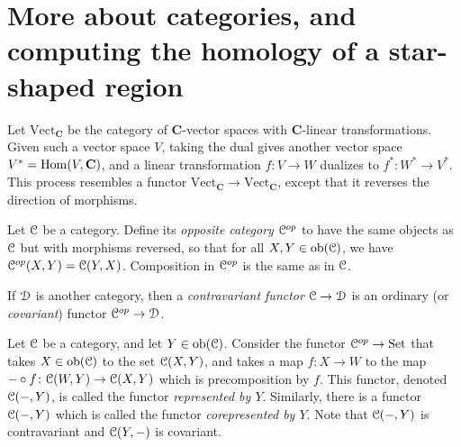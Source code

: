 \section{More about categories, and computing the homology of a star-shaped region}
Let $\mathrm{Vect}_{\mathbf{C}}$ be the category of $\mathbf{C}$-vector spaces with $\mathbf{C}$-linear transformations. Given such a vector space $V$, taking the dual gives another vector space $V^\ast=\operatorname{Hom}(V,\mathbf{C})$, and a linear transformation $f:V\to W$ dualizes to $f^\ast:W^\ast\to V^\ast$. This process resembles a functor $\mathrm{Vect}_{\mathbf{C}} \to \mathrm{Vect}_{\mathbf{C}}$, except that it reverses the direction of morphisms.
\begin{definition}
Let $\mathcal C$ be a category. Define its \emph{opposite category} $\mathcal C^{op}$ to have the same objects as $\mathcal C$ but with morphisms reversed, so that for all $X,Y\in\mathrm{ob}(\mathcal C)$, we have $\mathcal C^{op}(X,Y) = \mathcal C(Y,X)$. Composition in $\mathcal C^{op}$ is the same as in $\mathcal C$.

If $\mathcal D$ is another category, then a \emph{contravariant functor} $\mathcal C\to \mathcal D$ is an ordinary (or \emph{covariant}) functor $\mathcal C^{op}\to\mathcal D$.
\end{definition}
Let $\mathcal C$ be a category, and let $Y\in\mathrm{ob}(\mathcal C)$. Consider the functor $\mathcal C^{op}\to{\mathrm{Set}}$ that takes $X\in\mathrm{ob}(\mathcal C)$ to the set $\mathcal C(X,Y)$, and takes a map $f\colon X\to W$ to the map $-\circ f\colon \mathcal C(W,Y)\to \mathcal C(X,Y)$ which is precomposition by $f$. This functor, denoted $\mathcal C(-,Y)$, is called the functor \emph{represented by $Y$}. Similarly, there is a functor $\mathcal C(-,Y)$ which is called the functor \emph{corepresented by $Y$}. Note that $\mathcal C(-,Y)$ is contravariant and $\mathcal C(Y,-)$ is covariant.

